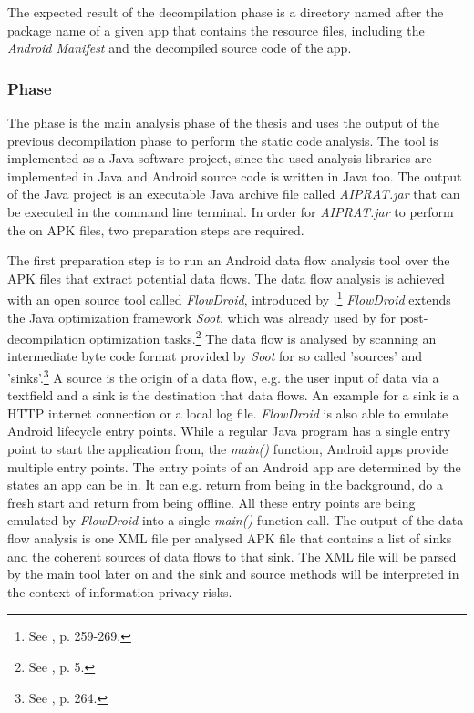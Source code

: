 The expected result of the decompilation phase is a directory named after the package name of a given app that contains the resource files, including the \textit{Android Manifest} and the decompiled source code of the app.

\subsubsection{\Sca Phase}

The \sca phase is the main analysis phase of the thesis and uses the output of the previous decompilation phase to perform the static code analysis.
The \sca tool is implemented as a Java software project, since the used analysis libraries are implemented in Java and Android source code is written in Java too.
The output of the \sca Java project is an executable Java archive file called \textit{AIPRAT.jar} that can be executed in the command line terminal.
In order for \textit{AIPRAT.jar} to perform the \sca on APK files, two preparation steps are required.

The first preparation step is to run an Android data flow analysis tool over the APK files that extract potential data flows.
The data flow analysis is achieved with an open source tool called \textit{FlowDroid}, introduced by \cite{Arzt2014}.\footnote{See \cite{Arzt2014}, p. 259-269.}
\textit{FlowDroid} extends the Java optimization framework \textit{Soot}, which was already used by \cite{Enck2011} for post-decompilation optimization tasks.\footnote{See \cite{Enck2011}, p. 5.}
The data flow is analysed by scanning an intermediate byte code format provided by \textit{Soot} for so called 'sources' and 'sinks'.\footnote{See \cite{Arzt2014}, p. 264.}
A source is the origin of a data flow, e.g. the user input of data via a textfield and a sink is the destination that data flows.
An example for a sink is a HTTP internet connection or a local log file.
\textit{FlowDroid} is also able to emulate Android lifecycle entry points.
While a regular Java program has a single entry point to start the application from, the \textit{main()} function, Android apps provide multiple entry points.
The entry points of an Android app are determined by the states an app can be in. 
It can e.g. return from being in the background, do a fresh start and return from being offline.
All these entry points are being emulated by \textit{FlowDroid} into a single \textit{main()} function call.
The output of the data flow analysis is one XML file per analysed APK file that contains a list of sinks and the coherent sources of data flows to that sink.
The XML file will be parsed by the main \sca tool later on and the sink and source methods will be interpreted in the context of information privacy risks.

